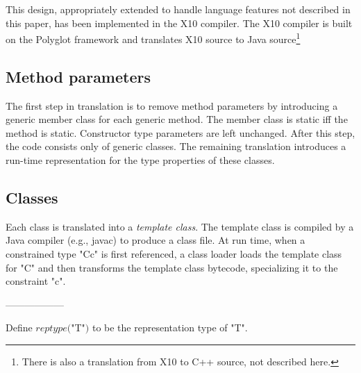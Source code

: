 \documentclass[preprint,nocopyrightspace,9pt]{sigplanconf}
\begin{document}
This design, appropriately extended to handle language features
not described in this paper, has been implemented in the X10
compiler.  The X10 compiler is built on the Polyglot framework
and translates X10 source to Java source\footnote{There is also
a translation from X10 to C++ source, not described here.}

\subsection{Method parameters}

The first step in translation is to remove method parameters by
introducing a generic member class for each generic method.
The member class is static iff the method is static.
Constructor type parameters are left unchanged.
After this step, the code consists only of generic classes.
The remaining translation introduces a run-time representation
for the type properties of these classes.

\subsection{Classes}

Each class is translated into a \emph{template class}.
The template class is compiled by a Java compiler (e.g., javac)
to produce a class file.
At run time, when a constrained type \xcd"C{c}" is first referenced, a
class loader loads the template class for \xcd"C" and then transforms the
template class bytecode, specializing it to the constraint
\xcd"c".

------------------

Define $\mathit{reptype}($\xcd"T"$)$ to be the representation
type of \xcd"T".






\end{document}
